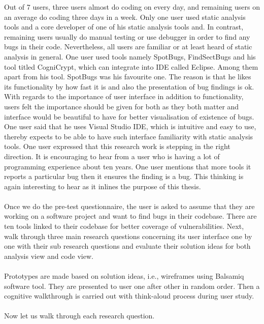Out of 7 users, three users almost do coding on every day, and remaining users on an average do coding three days in a week.  Only one user used static analysis tools and a core developer of one of his static analysis tools and. In contrast, remaining users usually do manual testing or use debugger in order to find any bugs in their code. Nevertheless, all users are familiar or at least heard of static analysis in general. One user used tools namely SpotBugs, FindSectBugs and his tool titled CogniCrypt, which can integrate into IDE called Eclipse. Among them apart from his tool. SpotBugs was his favourite one. The reason is that he likes its functionality by how fast it is and also the presentation of bug findings is ok. With regards to the importance of user interface in addition to functionality, users felt the importance should be given for both as they both matter and interface would be beautiful to have for better visualisation of existence of bugs. One user said that he uses Visual Studio IDE, which is intuitive and easy to use, thereby expects to be able to have such interface familiarity with static analysis tools. One user expressed that this research work is stepping in the right direction. It is encouraging to hear from a user who is having a lot of programming experience about ten years. One user mentions that more tools it reports a particular bug then it ensures the finding is a bug. This thinking is again interesting to hear as it inlines the purpose of this thesis. \\ \\ 

Once we do the pre-test questionnaire, the user is asked to assume that they are working on a software project and want to find bugs in their codebase. There are ten tools linked to their codebase for better coverage of vulnerabilities. Next, walk through three main research questions concerning its user interface one by one with their sub research questions and evaluate their solution ideas for both analysis view and code view. \\ \\

Prototypes are made based on solution ideas, i.e., wireframes using Balsamiq software tool. They are presented to user one after other in random order. Then a cognitive walkthrough is carried out with think-aloud process during user study. \\ \\

Now let us walk through each research question. \\ \\

